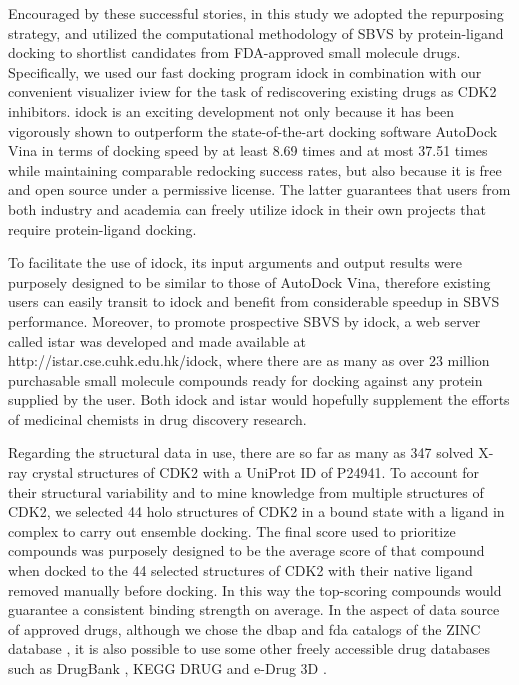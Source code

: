 Encouraged by these successful stories, in this study we adopted the repurposing strategy, and utilized the computational methodology of SBVS by protein-ligand docking to shortlist candidates from FDA-approved small molecule drugs. Specifically, we used our fast docking program idock \citep{1153,1362} in combination with our convenient visualizer iview \citep{1366} for the task of rediscovering existing drugs as CDK2 inhibitors. idock is an exciting development not only because it has been vigorously shown \citep{1362} to outperform the state-of-the-art docking software AutoDock Vina \citep{595} in terms of docking speed by at least 8.69 times and at most 37.51 times while maintaining comparable redocking success rates, but also because it is free and open source under a permissive license. The latter guarantees that users from both industry and academia can freely utilize idock in their own projects that require protein-ligand docking.

To facilitate the use of idock, its input arguments and output results were purposely designed to be similar to those of AutoDock Vina, therefore existing users can easily transit to idock and benefit from considerable speedup in SBVS performance. Moreover, to promote prospective SBVS by idock, a web server called istar \citep{1362} was developed and made available at http://istar.cse.cuhk.edu.hk/idock, where there are as many as over 23 million purchasable small molecule compounds ready for docking against any protein supplied by the user. Both idock \citep{1153} and istar \citep{1362} would hopefully supplement the efforts of medicinal chemists in drug discovery research.

Regarding the structural data in use, there are so far as many as 347 solved X-ray crystal structures of CDK2 with a UniProt ID of P24941. To account for their structural variability and to mine knowledge from multiple structures of CDK2, we selected 44 holo structures of CDK2 in a bound state with a ligand in complex to carry out ensemble docking. The final score used to prioritize compounds was purposely designed to be the average score of that compound when docked to the 44 selected structures of CDK2 with their native ligand removed manually before docking. In this way the top-scoring compounds would guarantee a consistent binding strength on average. In the aspect of data source of approved drugs, although we chose the dbap and fda catalogs of the ZINC database \citep{532,1178}, it is also possible to use some other freely accessible drug databases such as DrugBank \citep{1594}, KEGG DRUG \citep{1595} and e-Drug 3D \citep{1125}.

